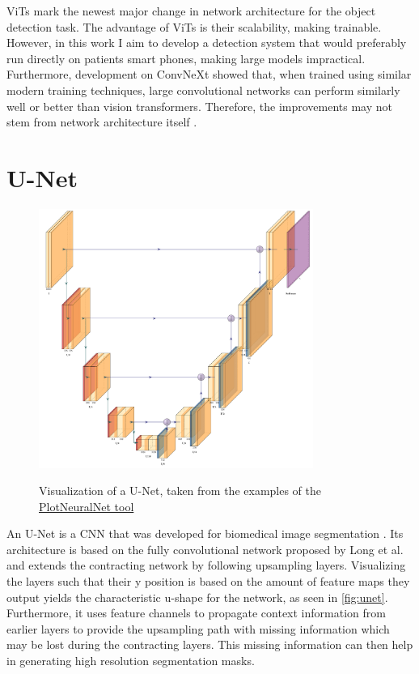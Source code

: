 \documentclass[10pt]{book}
\begin{document}
\acp{ViT} mark the newest major change in network architecture for the object detection task. The advantage of \acp{ViT} is their scalability, making \cite[models of unprecedented size]{dosovitskiy2020image} trainable. However, in this work I aim to develop a detection system that would preferably run directly on patients smart phones, making large models impractical. Furthermore, development on ConvNeXt showed that, when trained using similar modern training techniques, large convolutional networks can perform similarly well or better than vision transformers. Therefore, the improvements may not stem from network architecture itself \cite{liu2022convnet}.

\section{U-Net}

\begin{figure}
  \caption{Visualization of a U-Net, taken from the examples of the \href{https://github.com/HarisIqbal88/PlotNeuralNet}{PlotNeuralNet tool} \cite{haris_iqbal_2018_2526396}}
  \includegraphics[width=0.8\textwidth]{image/Unet_ushape}
  \label{fig:unet}
\end{figure}

An U-Net is a \ac{CNN} that was developed for biomedical image segmentation \cite{DBLP:journals/corr/RonnebergerFB15}. Its architecture is based on the fully convolutional network proposed by Long et al. \cite{DBLP:journals/corr/LongSD14} and extends the contracting network by following upsampling layers. Visualizing the layers such that their y position is based on the amount of feature maps they output yields the characteristic u-shape for the network, as seen in \autoref{fig:unet}. Furthermore, it uses feature channels to propagate context information from earlier layers to provide the upsampling path with missing information which may be lost during the contracting layers. This missing information can then help in generating high resolution segmentation masks.
\end{document}
